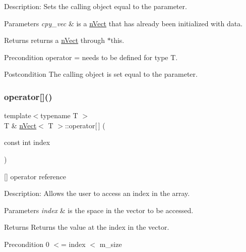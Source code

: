 Description\+: Sets the calling object equal to the parameter. 
\begin{DoxyParams}{Parameters}
{\em cpy\+\_\+vec} & is a \hyperlink{classnVect}{n\+Vect} that has already been initialized with data. \\
\hline
\end{DoxyParams}
\begin{DoxyReturn}{Returns}
returns a \hyperlink{classnVect}{n\+Vect} through $\ast$this. 
\end{DoxyReturn}
\begin{DoxyPrecond}{Precondition}
operator = needs to be defined for type T. 
\end{DoxyPrecond}
\begin{DoxyPostcond}{Postcondition}
The calling object is set equal to the parameter. 
\end{DoxyPostcond}
\mbox{\label{classnVect_a3fb4c0900764f5b46c402639a1baf01f}} 
\subsubsection{\texorpdfstring{operator[]()}{operator[]()}\hspace{0.1cm}{\footnotesize\ttfamily [1/2]}}
{\footnotesize\ttfamily template$<$typename T $>$ \\
T \& \hyperlink{classnVect}{n\+Vect}$<$ T $>$\+::operator\mbox{[}$\,$\mbox{]} (\begin{DoxyParamCaption}\item[{const int}]{index }\end{DoxyParamCaption})}



\mbox{[}\mbox{]} operator reference 

Description\+: Allows the user to access an index in the array. 
\begin{DoxyParams}{Parameters}
{\em index} & is the space in the vector to be accessed. \\
\hline
\end{DoxyParams}
\begin{DoxyReturn}{Returns}
Returns the value at the index in the vector. 
\end{DoxyReturn}
\begin{DoxyPrecond}{Precondition}
0 $<$= index $<$ m\+\_\+size 
\end{DoxyPrecond}

